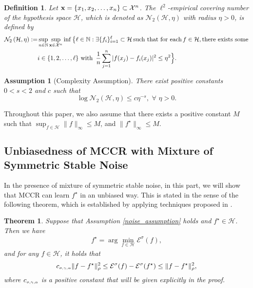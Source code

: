 \documentclass[11pt]{article}
\newtheorem{theorem}{Theorem}
\newtheorem{definition}{Definition}
\newtheorem{assumption}{Assumption}
\begin{document}
\begin{definition} 
	Let ${\bf
		x}=\{x_1,x_2,\ldots,x_n\} \subset \mathcal{X}^n$. 
	The $\ell^2$-empirical covering number of the hypothesis space $\mathcal{H}$, which is denoted as $\mathcal{N}_2\left(\mathcal{H}, \eta\right)$ with radius $\eta>0$, is defined by
	\begin{align*}
	\mathcal{N}_2\left(\mathcal{H}, \eta\right):=&\sup_{n \in \mathbb{N}}\sup_{\mathbf{x}\in \mathcal{X}^n}\inf\left\{\ell\in\mathbb{N}:\exists \{f_i\}_{i=1}^\ell\subset\mathcal{H}  \,\hbox{such that for each}\,  f\in\mathcal{H},\hbox{there exists some}\right.\\
	&i\in\{1,2,\ldots,\ell\} \,\, \hbox{with}\,\,\,  \frac{1}{n}\sum_{j=1}^n |f(x_j)-f_i(x_j)|^2\leq \eta^2\Big\}.
	\end{align*}
\end{definition} 


\begin{assumption}[Complexity Assumption]\label{complexity_assumption} 
	There exist positive constants $0<s<2$ and $c$ such that
	$$\log\mathcal{N}_2(\mathcal{H},\eta)\leq c \eta^{-s},\,\, \forall\,\,
	\eta>0.$$
\end{assumption}

Throughout this paper, we also assume that there exists a positive constant $M$ such that $\sup_{f\in\mathcal{H}}\|f\|_\infty\leq M$, and $\|f^\star\|_\infty\leq M$.   


\subsection{Unbiasedness of MCCR with Mixture of Symmetric Stable Noise}
In the presence of mixture of symmetric stable noise, in this part, we will show that MCCR can learn $f^\star$ in an unbiased way. This is stated in the sense of the following theorem, which is established by applying techniques proposed in \cite{fan2014consistency}.  

\begin{theorem}\label{equivalent_theorem}
	Suppose that Assumption \ref{noise_assumption} holds and $f^\star\in\mathcal{H}$. Then we have
	\begin{align*}
	f^\star=\arg\min_{f\in\mathcal{H}}\mathcal{E}^\sigma(f),
	\end{align*}
	and for any $f\in\mathcal{H}$, it holds that
	\begin{align*}
	c_\mathsmaller{\sigma,\gamma,\alpha} \|f-f^\star\|_\rho^2 \leq \mathcal{E}^\sigma(f)-\mathcal{E}^\sigma(f^\star)\leq  \|f-f^\star\|_\rho^2,
	\end{align*}
	where $c_\mathsmaller{\sigma,\gamma,\alpha}$ is a positive constant that will be given explicitly in the proof.  
\end{theorem}
\end{document}
